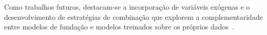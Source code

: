 \documentclass[12pt]{article}
\begin{document}
Como trabalhos futuros, destacam-se a incorporação de variáveis exógenas e o desenvolvimento de estratégias de combinação que explorem a complementaridade entre modelos de fundação e modelos treinados sobre os próprios dados~\cite{petropoulos2022forecasting}.



\end{document}

